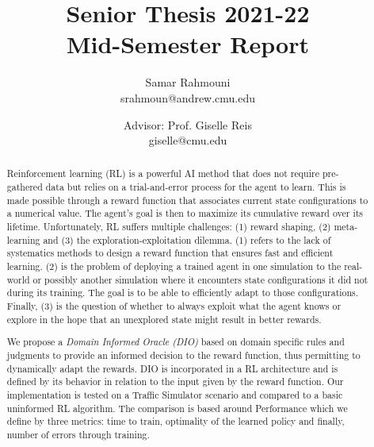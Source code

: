 \documentclass[a4paper,11pt]{article}
\author{%
  \begin{minipage}[t]{0.47\textwidth}
    \centering
    Samar Rahmouni \\ srahmoun@andrew.cmu.edu
  \end{minipage}
  \and
  \begin{minipage}[t]{0.45\textwidth}
    \centering
    Advisor: Prof. Giselle Reis \\ giselle@cmu.edu
  \end{minipage}%
  \vspace*{2ex}
}
\date{}
\title{{\Large\sc Senior Thesis 2021-22\\[2ex]}{\LARGE\bf Mid-Semester Report\vspace*{3ex}}}
\begin{document}
\maketitle 

\begin{abstract} Reinforcement learning (RL) is a powerful AI method that does not require pre-gathered data but 
  relies on a trial-and-error process for the agent to learn. This is made possible through a reward function that associates 
  current state configurations to a numerical value. The agent's goal is then to maximize its cumulative reward over its lifetime. 
  Unfortunately, RL suffers multiple challenges: (1) reward shaping, (2) meta-learning and (3) the exploration-exploitation dilemma. 
  (1) refers to the lack of systematics methods to design a reward function that ensures fast and efficient learning. (2) is the problem of 
  deploying a trained agent in one simulation to the real-world or possibly another simulation where it encounters 
  state configurations it did not during its training. The goal is to be able to efficiently adapt to those configurations. Finally, (3) 
  is the question of whether to always exploit what the agent knows or explore in the hope that an unexplored state 
  might result in better rewards. 

  \medskip 

  We propose a \emph{Domain Informed Oracle (DIO)} based on domain specific rules and judgments to provide 
  an informed decision to the reward function, thus permitting to dynamically adapt the rewards. DIO is incorporated 
  in a RL architecture and is defined by its behavior in relation to the input given by the reward function. 
  Our implementation is tested on a Traffic Simulator scenario and compared to a basic uninformed RL algorithm. The comparison 
  is based around Performance which we define by three metrics: time to train, optimality of the learned policy and finally, number of errors through training. 
  
\end{abstract}
\end{document}
